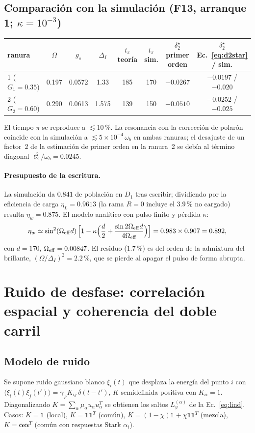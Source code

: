\documentclass[11pt,a4paper]{article}
\newcommand{\wb}{\omega_b}
\newcommand{\gphi}{\gamma_\varphi}
\begin{document}
\subsection{Comparación con la simulación (F13, arranque 1; $\kappa=10^{-3}$)}
\begin{center}\small
\begin{tabular}{lccccccc}\toprule
ranura & $\Omega$ & $g_s$ & $\Delta_I$ & $t_\pi$ teoría & $t_\pi$ sim. & $\delta_2^\star$ primer orden & $\delta_2^\star$ Ec.~\eqref{eq:d2star} / sim.\\\midrule
1 ($G_1{=}0.35$) & 0.197 & 0.0572 & 1.33 & 185 & 170 & $-0.0267$ & $-0.0197$ / $-0.020$\\
2 ($G_2{=}0.60$) & 0.290 & 0.0613 & 1.575 & 139 & 150 & $-0.0510$ & $-0.0252$ / $-0.025$\\\bottomrule
\end{tabular}
\end{center}
El tiempo $\pi$ se reproduce a $\lesssim10$\,\%. La resonancia con la corrección de polarón coincide con la simulación a $\lesssim5\times10^{-4}\,\wb$ en ambas ranuras;
el desajuste de un factor~2 de la estimación de primer orden en la ranura~2 se debía al término diagonal $\ell_2^2/\wb=0.0245$.

\paragraph{Presupuesto de la escritura.}
La simulación da $0.841$ de población en $D_1$ tras escribir; dividiendo por la eficiencia de carga $\eta_L=0.9613$ (la rama $R=0$ incluye el $3.9$\,\% no cargado) resulta $\eta_w=0.875$.
El modelo analítico con pulso finito y pérdida $\kappa$:
\begin{equation}
\eta_w\simeq\sin^2(\Omega_{\rm eff}d)\,\Big[1-\kappa\Big(\frac d2+\frac{\sin 2\Omega_{\rm eff}d}{4\Omega_{\rm eff}}\Big)\Big]=0.983\times0.907=0.892,
\end{equation}
con $d=170$, $\Omega_{\rm eff}=0.00847$. El residuo ($1.7$\,\%) es del orden de la admixtura del brillante, $(\Omega/\Delta_I)^2=2.2$\,\%, que se pierde al apagar el pulso de forma abrupta.

\section{Ruido de desfase: correlación espacial y coherencia del doble carril}\label{sec:ruido}
\subsection{Modelo de ruido}
Se supone ruido gaussiano blanco $\xi_i(t)$ que desplaza la energía del punto $i$ con
$\langle\xi_i(t)\xi_j(t')\rangle=\gphi K_{ij}\,\delta(t-t')$, $K$ semidefinida positiva con $K_{ii}=1$. Diagonalizando
$K=\sum_\alpha\mu_\alpha u_\alpha u_\alpha^{\!T}$ se obtienen los saltos $L_\varphi^{(\alpha)}$ de la Ec.~\eqref{eq:lind}.
Casos: $K=\mathbb 1$ (local), $K=\bm1\bm1^{T}$ (común), $K=(1-\chi)\mathbb 1+\chi\bm1\bm1^{T}$ (mezcla), $K=\bm\alpha\bm\alpha^{T}$ (común con respuestas Stark $\alpha_i$).
\end{document}
